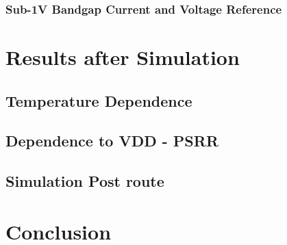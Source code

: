 \documentclass[11pt,a4paper]{report}
\begin{document}
\subsection{ Sub-1V Bandgap Current and Voltage Reference}



\chapter{Results after Simulation}
\section{Temperature Dependence}
\section{Dependence to VDD - PSRR}
\section{Simulation Post route}

\chapter*{Conclusion}



\begin{appendices}

\end{appendices}

\end{document}
